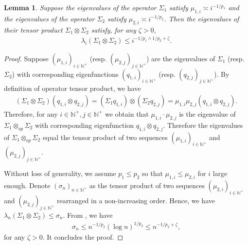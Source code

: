 \documentclass[11pt]{article}
\newcommand{\N}{\mathbb{N}}
\newcommand{\0}{\mathbf{0}}
\newtheorem{lem}{Lemma}[section]
\begin{document}
\begin{appendix}
\begin{lem}\label{lem:tensor_evd}
Suppose the eigenvalues of the operator $\Sigma_1$ satisfy $\mu_{1, i} \asymp i^{-1/p_1}$ and the eigenvalues of the operator $\Sigma_2$ satisfy $\mu_{2, i} \asymp i^{-1/p_2}$. Then the eigenvalues of their tensor product $\Sigma_1 \otimes \Sigma_2$ satisfy, for any $\zeta > 0$,
\begin{align*}
    \lambda_{i}(\Sigma_1 \otimes \Sigma_2) \leq i^{- 1/ p_1 \wedge 1/ p_2  + \zeta}.
\end{align*}
\end{lem}
\begin{proof}
Suppose $\left( \mu_{1, i} \right)_{i \in \N^+}$ (resp. $\left( \mu_{2, j} \right)_{j \in \N^+}$) are the eigenvalues of $\Sigma_1$ (resp. $\Sigma_2$) with corresponding eigenfunctions $\left( q_{1, i} \right)_{i \in \N^+}$ (resp. $\left( q_{2, j} \right)_{j \in \N^+}$). 
By definition of operator tensor product, we have
\begin{align*}
    \left( \Sigma_1 \otimes \Sigma_2 \right) (q_{1, i} \otimes q_{2, j} ) = \left( \Sigma_1  q_{1, i} \right) \otimes \left( \Sigma_2 q_{2, j} \right) = \mu_{1, i} \mu_{2, j} (q_{1, i} \otimes q_{2, j} ) .
\end{align*}
Therefore, for any $i \in \N^+, j \in \N^+$ we obtain that $\mu_{1, i} \cdot \mu_{2, j}$ is the eigenvalue of $\Sigma_1 \otimes_{op} \Sigma_2$ with corresponding eigenfunction $q_{1, i} \otimes q_{2, j}$. 
Therefore the eigenvalues of $\Sigma_1 \otimes_{op} \Sigma_2$ equal the tensor product of two sequences $(\mu_{1, i})_{i\in \N^+}$ and $(\mu_{2, j})_{j \in \N^+}$. 

Without loss of generality, we assume $p_1 \leq p_2$ so that $\mu_{1, i} \leq \mu_{2, i}$ for $i$ large enough. 
Denote $(\sigma_n)_{n\in \N^+}$ as the tensor product of two sequences $(\mu_{2, i})_{i\in \N^+}$ and $(\mu_{2, j})_{j \in \N^+}$ rearranged in a non-increasing order. Hence, we have $\lambda_{n}(\Sigma_1 \otimes \Sigma_2) \leq \sigma_n$.
From \cite{krieg2018tensor}, we have 
\begin{align*}
    \sigma_n \leq n^{- 1/p_2} (\log n)^{1/p_2} \leq n^{- 1/p_2 + \zeta},
\end{align*}
for any $\zeta > 0$.
It concludes the proof.
\end{proof}


\end{appendix}
\end{document}
